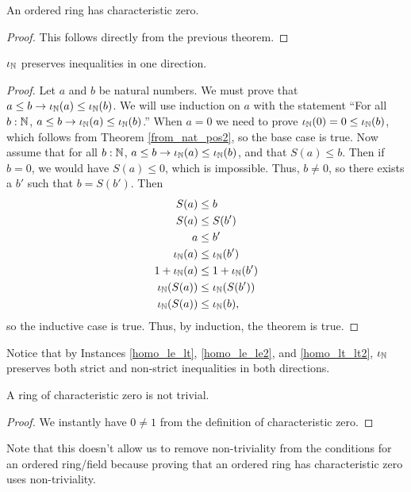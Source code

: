 \documentclass[../math.tex]{subfiles}
\begin{document}
\begin{instance}
    An ordered ring has characteristic zero.
\end{instance}
\begin{proof}
    This follows directly from the previous theorem.
\end{proof}

\begin{instance}
    $\iota_{\mathbb{N}}$ preserves inequalities in one direction.
\end{instance}
\begin{proof}
    Let $a$ and $b$ be natural numbers.  We must prove that $a \leq b
    \rightarrow \iota_{\mathbb{N}}(a) \leq \iota_{\mathbb{N}}(b)$.  We will use induction on $a$ with the
    statement ``For all $b : \mathbb{N}$, $a \leq b \rightarrow \iota_{\mathbb{N}}(a) \leq \iota_{\mathbb{N}}(b)$.''
    When $a = 0$ we need to prove $\iota_{\mathbb{N}}(0) = 0 \leq \iota_{\mathbb{N}}(b)$, which follows from
    Theorem \ref{from_nat_pos2}, so the base case is true.  Now assume that for
    all $b : \mathbb{N}$, $a \leq b \rightarrow \iota_{\mathbb{N}}(a) \leq \iota_{\mathbb{N}}(b)$, and that $S(a) \leq
    b$.  Then if $b = 0$, we would have $S(a) \leq 0$, which is impossible.
    Thus, $b \neq 0$, so there exists a $b'$ such that $b = S(b')$.  Then
    \begin{align*}
        S(a) &\leq b \\
        S(a) &\leq S(b') \\
        a &\leq b' \\
        \iota_{\mathbb{N}}(a) &\leq \iota_{\mathbb{N}}(b') \\
        1 + \iota_{\mathbb{N}}(a) &\leq 1 + \iota_{\mathbb{N}}(b') \\
        \iota_{\mathbb{N}}(S(a)) &\leq \iota_{\mathbb{N}}(S(b')) \\
        \iota_{\mathbb{N}}(S(a)) &\leq \iota_{\mathbb{N}}(b),
    \end{align*}
    so the inductive case is true.  Thus, by induction, the theorem is true.
\end{proof}

Notice that by Instances \ref{homo_le_lt}, \ref{homo_le_le2}, and
\ref{homo_lt_lt2}, $\iota_{\mathbb{N}}$ preserves both strict and non-strict inequalities in
both directions.

\begin{instance}
    A ring of characteristic zero is not trivial.
\end{instance}
\begin{proof}
    We instantly have $0 \neq 1$ from the definition of characteristic zero.
\end{proof}
\noindent Note that this doesn't allow us to remove non-triviality from the
conditions for an ordered ring/field because proving that an ordered ring has
characteristic zero uses non-triviality.
\end{document}
